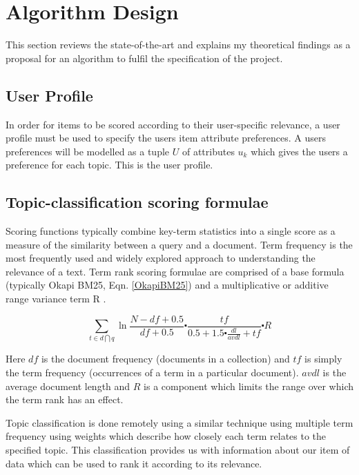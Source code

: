 \chapter{Algorithm Design}
 
This section reviews the state-of-the-art and explains my theoretical findings as a proposal for an algorithm to fulfil the specification of the project. 

\section{User Profile}

In order for items to be scored according to their user-specific relevance, a user profile must be used to specify the users item attribute preferences. A users preferences will be modelled as a tuple $U$ of attributes $u_k$ which gives the users a preference for each topic. This is the user profile.

\section{Topic-classification scoring formulae}

Scoring functions typically combine key-term statistics into a single score as a measure of the similarity between a query and a document.
Term frequency is the most frequently used and widely explored approach to understanding the relevance of a text. Term rank scoring formulae are comprised of a base formula (typically Okapi BM25, Eqn. \ref{OkapiBM25}) and a multiplicative or additive range variance term R \cite{OkapiBM25Paper}.

\begin{equation}\label{OkapiBM25}
	\sum\limits_{t\in d \bigcap q} \ln{\frac{N-df+0.5}{df+0.5}}\centerdot \frac{tf}{0.5+1.5 \centerdot \frac{dl}{avdl}+tf} \centerdot R
\end{equation}

Here $df$ is the document frequency (documents in a collection) and $tf$ is simply the term frequency (occurrences of a term in a particular document). $avdl$ is the average document length and $R$ is a component which limits the range over which the term rank has an effect. 

Topic classification is done remotely using a similar technique using multiple term frequency using weights which describe how closely each term relates to the specified topic. This classification provides us with information about our item of data which can be used to rank it according to its relevance. 

